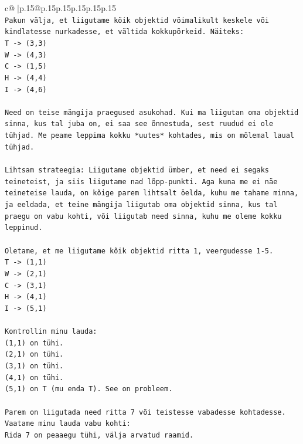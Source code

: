 \documentclass{article}
\begin{document}
{\begin{supertabular}{c@{$\;$}|p{.15\linewidth}@{}p{.15\linewidth}p{.15\linewidth}p{.15\linewidth}p{.15\linewidth}p{.15\linewidth}}
{{{\\ 
\texttt{Pakun välja, et liigutame kõik objektid võimalikult keskele või kindlatesse nurkadesse, et vältida kokkupõrkeid. Näiteks:} \\
\texttt{T {-}> (3,3)} \\
\texttt{W {-}> (4,3)} \\
\texttt{C {-}> (1,5)} \\
\texttt{H {-}> (4,4)} \\
\texttt{I {-}> (4,6)} \\
\\ 
\texttt{Need on teise mängija praegused asukohad. Kui ma liigutan oma objektid sinna, kus tal juba on, ei saa see õnnestuda, sest ruudud ei ole tühjad. Me peame leppima kokku *uutes* kohtades, mis on mõlemal laual tühjad.} \\
\\ 
\texttt{Lihtsam strateegia: Liigutame objektid ümber, et need ei segaks teineteist, ja siis liigutame nad lõpp{-}punkti. Aga kuna me ei näe teineteise lauda, on kõige parem lihtsalt öelda, kuhu me tahame minna, ja eeldada, et teine mängija liigutab oma objektid sinna, kus tal praegu on vabu kohti, või liigutab need sinna, kuhu me oleme kokku leppinud.} \\
\\ 
\texttt{Oletame, et me liigutame kõik objektid ritta 1, veergudesse 1{-}5.} \\
\texttt{T {-}> (1,1)} \\
\texttt{W {-}> (2,1)} \\
\texttt{C {-}> (3,1)} \\
\texttt{H {-}> (4,1)} \\
\texttt{I {-}> (5,1)} \\
\\ 
\texttt{Kontrollin minu lauda:} \\
\texttt{(1,1) on tühi.} \\
\texttt{(2,1) on tühi.} \\
\texttt{(3,1) on tühi.} \\
\texttt{(4,1) on tühi.} \\
\texttt{(5,1) on T (mu enda T). See on probleem.} \\
\\ 
\texttt{Parem on liigutada need ritta 7 või teistesse vabadesse kohtadesse.} \\
\texttt{Vaatame minu lauda vabu kohti:} \\
\texttt{Rida 7 on peaaegu tühi, välja arvatud raamid.} \\
}}}
\end{supertabular}}
\end{document}
